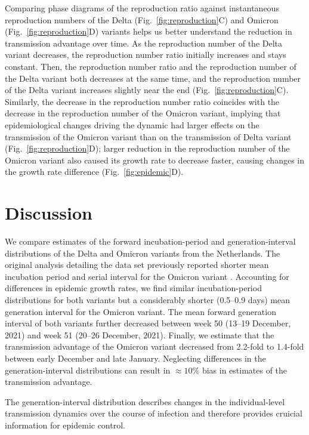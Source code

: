\documentclass[12pt]{article}
\newcommand{\fref}[1]{Fig.~\ref{fig:#1}}
\begin{document}
Comparing phase diagrams of the reproduction ratio against instantaneous reproduction numbers of the Delta (\fref{reproduction}C) and Omicron (\fref{reproduction}D) variants helps us better understand the reduction in transmission advantage over time.
As the reproduction number of the Delta variant decreases, the reproduction number ratio initially increases and stays constant. 
Then, the reproduction number ratio and the reproduction number of the Delta variant both decreases at the same time, and the reproduction number of the Delta variant increases slightly near the end (\fref{reproduction}C).
Similarly, the decrease in the reproduction number ratio coincides with the decrease in the reproduction number of the Omicron variant, implying that epidemiological changes driving the dynamic had larger effects on the transmission of the Omicron variant than on the transmission of Delta variant (\fref{reproduction}D);
larger reduction in the reproduction number of the Omicron variant also caused its growth rate to decrease faster, causing changes in the growth rate difference (\fref{epidemic}D).

\section{Discussion}

We compare estimates of the forward incubation-period and generation-interval distributions of the Delta and Omicron variants from the Netherlands.
The original analysis detailing the data set previously reported shorter mean incubation period and serial interval for the Omicron variant \citep{backer2021omicron}.
Accounting for differences in epidemic growth rates, we find similar incubation-period distributions for both variants but a considerably shorter (0.5--0.9 days) mean generation interval for the Omicron variant.
The mean forward generation interval of both variants further decreased between week 50 (13--19 December, 2021) and week 51 (20--26 December, 2021).
Finally, we estimate that the transmission advantage of the Omicron variant decreased from 2.2-fold to 1.4-fold between early December and late January. 
Neglecting differences in the generation-interval distributions can result in $\approx 10\%$ bias in estimates of the transmission advantage.

The generation-interval distribution describes changes in the individual-level transmission dynamics over the course of infection and therefore provides cruicial information for epidemic control.
\end{document}
